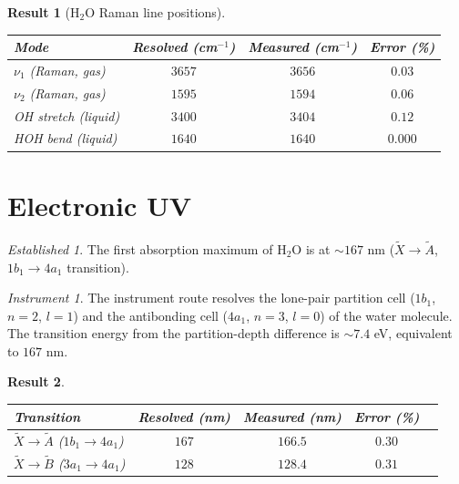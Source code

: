 \documentclass[11pt,a4paper]{article}
\theoremstyle{stmtstyle}
\newtheorem{result}{Result}
\theoremstyle{definition}
\theoremstyle{remark}
\newtheorem*{established}{Established}
\newtheorem*{instrument}{Instrument}
\begin{document}
\begin{result}[H$_{2}$O Raman line positions]\label{res:h2oraman}
\begin{center}\small
\begin{tabular}{lccc}
\toprule
Mode & Resolved (cm$^{-1}$) & Measured (cm$^{-1}$) & Error (\%)\\
\midrule
$\nu_{1}$ (Raman, gas)     & $3657$ & $3656$ & $0.03$\\
$\nu_{2}$ (Raman, gas)     & $1595$ & $1594$ & $0.06$\\
OH stretch (liquid)        & $3400$ & $3404$ & $0.12$\\
HOH bend (liquid)          & $1640$ & $1640$ & $0.000$\\
\bottomrule
\end{tabular}
\end{center}
\end{result}

\section{Electronic UV}
\label{sec:h2ouv}

\begin{established}
The first absorption maximum of H$_{2}$O is at $\sim 167$ nm ($\tilde X\to\tilde A$, $1b_{1}\to 4a_{1}$ transition).
\end{established}

\begin{instrument}
The instrument route resolves the lone-pair partition cell ($1b_{1}$, $n=2$, $l=1$) and the antibonding cell ($4a_{1}$, $n=3$, $l=0$) of the water molecule. The transition energy from the partition-depth difference is $\sim 7.4$ eV, equivalent to $167$ nm.
\end{instrument}

\begin{result}\label{res:h2ouv}
\begin{center}\small
\begin{tabular}{lcccc}
\toprule
Transition & Resolved (nm) & Measured (nm) & Error (\%)\\
\midrule
$\tilde X\to\tilde A$ ($1b_{1}\to 4a_{1}$)  & $167$ & $166.5$ & $0.30$\\
$\tilde X\to\tilde B$ ($3a_{1}\to 4a_{1}$)  & $128$ & $128.4$ & $0.31$\\
\bottomrule
\end{tabular}
\end{center}
\end{result}
\end{document}
